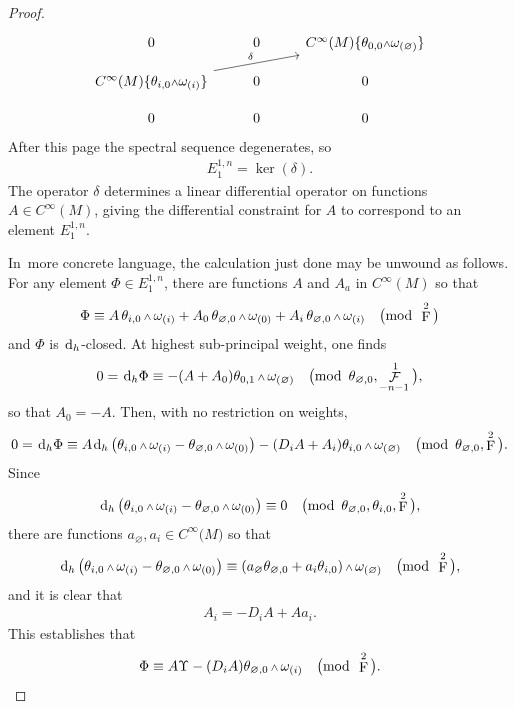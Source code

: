 \documentclass[pdftex]{sigma}
\renewcommand{\d}{{\rm d}}
\newcommand{\cinfinity}[1]{C^\infty\big(#1\big)}
\renewcommand{\mod}[1]{\quad\big(\mathrm{mod\enspace} #1\big)}
\newcommand{\w}{{\mathchoice{\,{\scriptstyle\wedge}\,}{{\scriptstyle\wedge}}
 {{\scriptscriptstyle\wedge}}{{\scriptscriptstyle\wedge}}}}
\newcommand{\thetas}[1]{\theta_{#1}}
\newcommand{\omegas}[1]{\omega_{(#1)}}
\DeclareMathOperator{\pwf}{F}
\DeclareMathOperator{\swf}{\mathcal{F}}
\renewcommand{\dh}{\ensuremath{\hspace{1pt} \d_h}}
\newcommand{\cMinfty}{C^\infty(M)}
\numberwithin{equation}{section}
\begin{document}
\begin{proof}
\[
\begin{tikzcd}
0 & 0 & \cMinfty\{\thetas{0,0}\w\omegas{\varnothing}\} \\[-2ex]
\cMinfty\{\thetas{i,0}\w\omegas{i}\} \ar[urr, "\delta"] & 0 & 0 \\[-2ex]
0 & 0 & 0
\end{tikzcd}
\]
After this page the spectral sequence degenerates, so
\begin{gather*}
E^{1,n}_1 = \ker(\delta) .
\end{gather*}
The operator $\delta$ determines a linear differential operator on functions $A \in \cMinfty$, giving the differential constraint for $A$ to correspond to an element $E^{1,n}_1$.

In~more concrete language, the calculation just done may be unwound as follows. For any element $\Phi\in E^{1,n}_1$, there are functions $A$ and $A_a$ in $\cMinfty$ so that
\begin{gather*}
\Phi \equiv A\,\thetas{i,0}\w\omegas{i} + A_0\,\thetas{\varnothing,0}\w\omegas{0} + A_i\,\thetas{\varnothing,0}\w\omegas{i} \mod{\pwf^2}
\end{gather*}
and $\Phi$ is $\dh$-closed. At highest sub-principal weight, one finds
\begin{gather*}
0 = \dh\Phi \equiv -(A + A_0)\thetas{0,1}\w\omegas{\varnothing} \mod{\thetas{\varnothing,0}, \swf^1_{-n-1}} ,
\end{gather*}
so that $A_0 = -A$. Then, with no restriction on weights,
\begin{gather*}
0 = \dh\Phi \equiv A\dh\left(\thetas{i,0}\w\omegas{i} - \thetas{\varnothing,0}\w\omegas{0}\right) - (D_iA + A_i)\thetas{i,0}\w\omegas{\varnothing} \mod{\thetas{\varnothing,0}, \pwf^2} .
\end{gather*}
Since
\begin{gather*}
\dh\left(\thetas{i,0}\w\omegas{i} - \thetas{\varnothing,0}\w\omegas{0}\right) \equiv 0 \mod{\thetas{\varnothing,0},\thetas{i,0}, \pwf^2} ,
\end{gather*}
there are functions $a_\varnothing, a_i \in \cinfinity{M}$ so that
\begin{gather*}
\dh\left(\thetas{i,0}\w\omegas{i} - \thetas{\varnothing,0}\w\omegas{0}\right) \equiv (a_\varnothing\thetas{\varnothing,0} + a_i\thetas{i,0})\w\omegas{\varnothing} \mod{\pwf^2} ,
\end{gather*}
and it is clear that
\begin{gather*}
A_i = - D_i A + Aa_i .
\end{gather*}
This establishes that
\begin{gather*}
\Phi \equiv A\Upsilon - (D_iA) \thetas{\varnothing,0}\w\omegas{i} \mod{\pwf^2} .
\end{gather*}


\end{proof}
\end{document}
